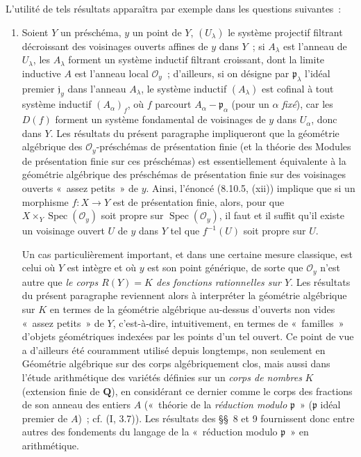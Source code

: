 \begin{env}[8.1.2]
\label{IV.8.1.2-fr}
L'utilité de tels résultats apparaîtra par exemple dans les questions
suivantes~:
\begin{enumerate}
\item[\emph{a)}] Soient $Y$ un préschéma, $y$ un point de $Y$, $(U_\lambda)$
le système projectif filtrant décroissant des voisinages ouverts affines de
$y$ dans $Y$~; si $A_\lambda$ est l'anneau de $U_\lambda$, les $A_\lambda$
forment un système inductif filtrant croissant, dont la limite inductive $A$
est l'anneau local $\mathcal O_y$~; d'ailleurs, si on désigne par
$\mathfrak p_\lambda$ l'idéal premier $\mathfrak j_y$ dans l'anneau
$A_\lambda$, le système inductif $(A_\lambda)$ est cofinal à tout système
inductif $(A_\alpha)_f$, où $f$ parcourt
$A_\alpha-\mathfrak p_\alpha$ (pour un $\alpha$ \emph{fixé}), car les $D(f)$
forment un système fondamental de voisinages de $y$ dans $U_\alpha$,
donc dans $Y$. Les résultats du présent paragraphe impliqueront que la
géométrie algébrique des $\mathcal O_y$-préschémas de présentation finie (et
la théorie des Modules de présentation finie sur ces préschémas) est
essentiellement équivalente à la géométrie algébrique des préschémas de
présentation finie sur des voisinages ouverts «~assez petits~» de $y$. Ainsi,
l'énoncé (8.10.5, (xii)) implique que si un morphisme $f:X\to Y$ est de
présentation finie, alors, pour que
$X\times_Y\operatorname{Spec}(\mathcal O_y)$ soit propre sur
$\operatorname{Spec}(\mathcal O_y)$, il faut et il suffit qu'il existe un
voisinage ouvert $U$ de $y$ dans $Y$ tel que $f^{-1}(U)$ soit propre sur $U$.

Un cas particulièrement important, et dans une certaine mesure classique,
est celui où $Y$ est intègre et où $y$ est son point générique, de sorte que
$\mathcal O_y$ n'est autre que \emph{le corps $R(Y)=K$ des fonctions
rationnelles sur $Y$}. Les résultats du présent paragraphe reviennent alors à
interpréter la géométrie algébrique sur $K$ en termes de la géométrie
algébrique au-dessus d'ouverts non vides «~assez petits~» de $Y$, c'est-à-dire,
intuitivement, en termes de «~familles~» d'objets géométriques indexées par les
points d'un tel ouvert. Ce point de vue a d'ailleurs été couramment utilisé
depuis longtemps, non seulement en Géométrie algébrique sur des corps
algébriquement clos, mais aussi dans l'étude arithmétique des variétés définies
sur un \emph{corps de nombres} $K$ (extension finie de $\mathbf Q$), en
considérant ce dernier comme le corps des fractions de son anneau des entiers
$A$ («~théorie de la \emph{réduction modulo} $\mathfrak p$~» ($\mathfrak p$
idéal premier de $A$)~; cf. (I, 3.7)). Les résultats des \S\S~8 et 9
fournissent donc entre autres des fondements du langage de la «~réduction
modulo $\mathfrak p$~» en arithmétique.


\end{enumerate}
\end{env}
